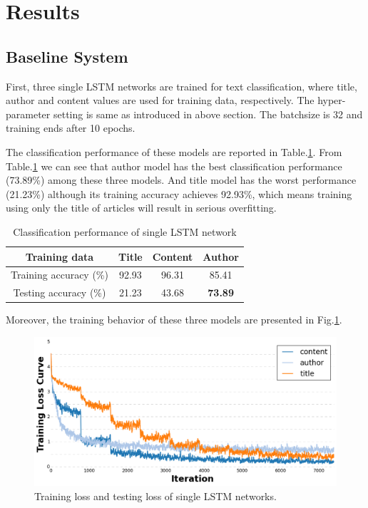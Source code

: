 \documentclass[12pt]{article}
\begin{document}
\section{Results}\label{results}

\subsection{Baseline System}

First, three single LSTM networks are trained for text classification, where title, author and content values are used for training data, respectively. The hyper-parameter setting is same as introduced in above section. The batchsize is 32 and training ends after 10 epochs.

The classification performance of these models are reported in Table.\ref{single_lstm_acc}. From Table.\ref{single_lstm_acc} we can see that author model has the best classification performance (73.89\%)  among these three models. And title model has the worst performance (21.23\%) although its training accuracy achieves 92.93\%, which means training using only the title of articles will result in serious overfitting.

\begin{table}[!t]
\begin{center}
\caption{Classification performance of single LSTM network}
\label{single_lstm_acc}
\begin{tabular}{c|c|c|c}
\hline
Training data & Title & Content & Author\\
\hline

Training accuracy (\%) & 92.93  & 96.31 & 85.41\\

Testing accuracy (\%) & 21.23  & 43.68 & \textbf{73.89} \\

\hline
\end{tabular}
\end{center}
\end{table}

Moreover, the training behavior of these three models are presented in Fig.\ref{training_loss_single}.


\begin{figure}[!t]
\begin{center}
\includegraphics[width=5in]{figures/loss_training_single.png}
\end{center}
\caption{Training loss and testing loss of single LSTM networks.}
\label{training_loss_single}
\end{figure}
\end{document}
